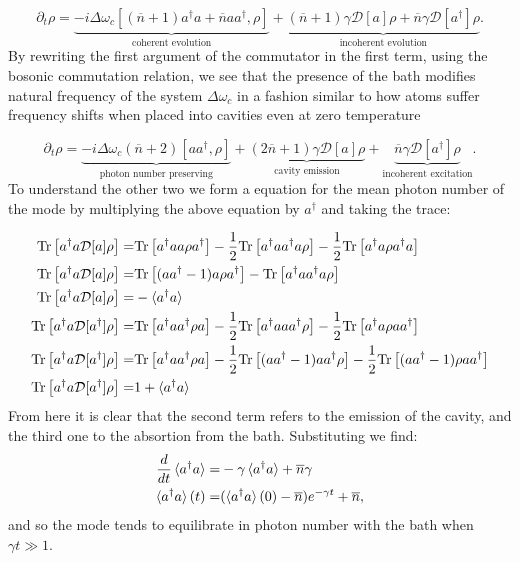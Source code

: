 \begin{equation}
  \partial_{t}\rho = \underbrace{-i\Delta\omega_{c}[(\overline{n}+1)a^{\dagger}a + \overline{n}aa^{\dagger}, \rho]}_{\text{coherent evolution}} + \underbrace{(\overline{n}+1)\gamma\mathcal{D}[a]\rho +
\overline{n}\gamma\mathcal{D}[a^{\dagger}]\rho}_{\text{incoherent evolution}}.
\end{equation}
By rewriting the first argument of the commutator  in the first term, using the bosonic commutation relation, we see that the presence of the bath modifies natural frequency of the system $\Delta\omega_{c}$ in a fashion similar to how atoms suffer frequency shifts when placed into cavities even at zero temperature \cite{dutra2005cavity}

\begin{equation}
\partial_{t}\rho = \underbrace{-i\Delta\omega_{c}(\overline{n}+2)[aa^{\dagger}, \rho]}_{\text{photon number preserving}} + \underbrace{(2\overline{n}+1)\gamma\mathcal{D}[a]\rho}_{\text{cavity emission}} +\underbrace{\overline{n}\gamma\mathcal{D}[a^{\dagger}]\rho}_{\text{incoherent excitation}}.\label{eq:cavity_model}
\end{equation}
To understand the other two we form a equation for the mean photon number of the mode by multiplying the above equation by $a^{\dagger}$ and
taking the trace:

\begin{align}
  \mathrm{Tr}\left[a^{\dagger}a\mathcal{D}[a]\rho\right] =& \mathrm{Tr}\left[a^{\dagger}aa\rho a^{\dagger}\right]-\frac{1}{2}\mathrm{Tr}\left[a^{\dagger}aa^{\dagger}a\rho\right]-\frac{1}{2}\mathrm{Tr}\left[a^{\dagger}a\rho a^{\dagger}a\right] \\
  \mathrm{Tr}\left[a^{\dagger}a\mathcal{D}[a]\rho\right] =& \mathrm{Tr}\left[(aa^{\dagger}-1)a\rho a^{\dagger}\right] - \mathrm{Tr}\left[a^{\dagger}aa^{\dagger}a\rho\right]\\
  \mathrm{Tr}\left[a^{\dagger}a\mathcal{D}[a]\rho\right] =&-\braket{a^{\dagger}a}\\
\mathrm{Tr}\left[a^{\dagger}a\mathcal{D}[a^{\dagger}]\rho\right] =& \mathrm{Tr}\left[a^{\dagger}aa^{\dagger}\rho a\right] - \frac{1}{2}\mathrm{Tr}\left[a^{\dagger}aaa^{\dagger}\rho\right] - \frac{1}{2}\mathrm{Tr}\left[a^{\dagger}a\rho aa^{\dagger}\right]\\
\mathrm{Tr}\left[a^{\dagger}a\mathcal{D}[a^{\dagger}]\rho\right] =& \mathrm{Tr}\left[a^{\dagger}aa^{\dagger}\rho a\right] - \frac{1}{2}\mathrm{Tr}\left[(aa^{\dagger}-1)aa^{\dagger}\rho\right] - \frac{1}{2}\mathrm{Tr}\left[(aa^{\dagger}-1)\rho aa^{\dagger}\right]\\
\mathrm{Tr}\left[a^{\dagger}a\mathcal{D}[a^{\dagger}]\rho\right] =& 1+ \braket{a^{\dagger}a}
\end{align}
From here it is clear that the second term refers to the emission of the cavity, and the third one to the absortion from the bath. Substituting
we find:
\begin{align}
  \frac{d}{dt}\braket{a^{\dagger}a} = &-\gamma\braket{a^{\dagger}a} + \overline{n}\gamma\\
  \braket{a^{\dagger}a}(t) =& (\braket{a^{\dagger}a}(0)-\overline{n})e^{-\gamma t} + \overline{n},
\end{align}
and so the mode tends to equilibrate in photon number with the bath when $\gamma t\gg 1$.
